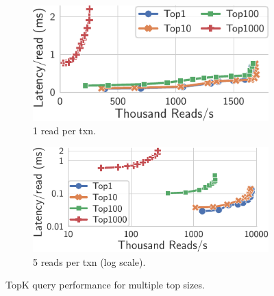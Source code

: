 \documentclass[sigplan,twocolumn,review,anonymous]{acmart}
\begin{document}
\begin{figure}
	\centering
	\begin{subfigure}{.471\linewidth}
		\includegraphics[width=1\linewidth]{singleQuery/bench_top_size_0_upd}
		\caption{1 read per txn.}
		\label{fig:topSize_single}
	\end{subfigure}%
	\hspace*{0.2em}
	\begin{subfigure}{.509\linewidth}
		\includegraphics[width=1\linewidth]{singleQuery/bench_top_size_0_upd_5b}
		\caption{5 reads per txn (log scale).}
		\label{fig:topSize_batch}
	\end{subfigure}%
	\vspace*{-0.65em}
	\caption{TopK query performance for multiple top sizes.}
	\label{fig:topSize}
	\vspace*{-0.2em} %
\end{figure}

\end{document}
